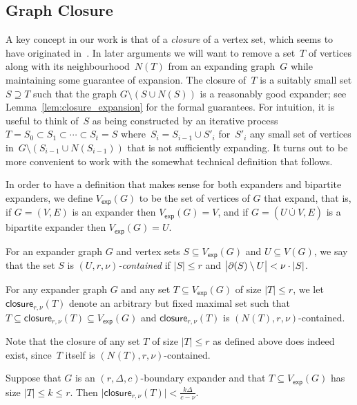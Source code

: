 \documentclass{article}
\newcommand{\boundary}[1]{\ensuremath{\partial #1}}
\newcommand{\Setsize}[1]{\bigl\lvert#1\bigr\rvert}
\newcommand{\setsize}[1]{\lvert#1\rvert}
\newcommand{\disjointunion}{\overset{.}{\cup}}
\newcommand{\reflem}[1]{Lemma~\ref{#1}}
\newcommand{\neigh}[2][]{N_{{#1}}(#2)}
\newcommand{\uniqueNeigh}[2][]{\boundary_{{#1}} ({#2})}
\newcommand{\GdegMax}{\Delta}
\newcommand{\gdegmax}{\GdegMax}
\newcommand{\contained}[3]{$(#1, #2, #3)$-contained}
\newcommand{\closure}[2][]{\mathsf{closure}_{{#1}}(#2)}
\newcommand{\expansionconst}{c}
\newcommand{\almostcontained}{\nu}
\newcommand{\setsizemax}{k}
\newcommand{\squeezesubsection}[1]{\subsection{#1}}
\numberwithin{equation}{section}
\begin{document}
\squeezesubsection{Graph Closure}

\newcommand{\Vexp}{V_{\mathsf{exp}}}

A key concept in our work is that of a \emph{closure} of a vertex set,
which seems to have originated
in~\cite{ABRW04Pseudorandom,AR03LowerBounds}. In later arguments we
will want to remove a set~$T$ of vertices along with its
neighbourhood~$N(T)$ from an expanding graph~$G$ while maintaining
some guarantee of expansion. The closure of~$T$ is a suitably small
set $S \supseteq T$ such that the graph $G\setminus (S \cup N(S))$ is
a reasonably good expander; see \reflem{lem:closure_expansion} for the
formal guarantees. For intuition, it is useful to think of~$S$ as being
constructed by an iterative
process~$T = S_0 \subset S_1 \subset \cdots \subset S_t = S$
where~$S_i = S_{i-1} \cup S'_i$ for~$S'_i$ any small set of vertices
in~$G\setminus (S_{i-1} \cup N(S_{i-1}))$ that is not sufficiently
expanding. It turns out to be more convenient to work with the
somewhat technical definition that follows.

In order to have a definition that makes sense for both expanders and
bipartite expanders, we define $\Vexp(G)$ to be the set of vertices of
$G$ that expand, that is, if $G=(V,E)$ is an expander then
$\Vexp(G) = V$, and if $G=(U\disjointunion V, E)$ is a bipartite
expander then $\Vexp(G) = U$.

\begin{definition}[Closure]\label{def:closure}
  For an expander graph $G$ and
  vertex sets $S \subseteq \Vexp(G) $ and $U \subseteq V(G)$,
  we say that
  the set $S$ is \emph{\contained{U}{r}{\almostcontained}} if
  $\setsize{S} \le r$ 
  and 
  $
  \Setsize{
    \uniqueNeigh{S} \setminus U
  }
  <
  \almostcontained \cdot \setsize{S}$. 

  For any expander graph $G$  and any set $T \subseteq \Vexp(G)$       of size $\setsize{T} \leq r$, we let
  $\closure[r, \almostcontained]{T}$
  denote an arbitrary but fixed maximal set
  such that
  $T \subseteq \closure[r, \almostcontained]{T} \subseteq \Vexp(G)$
  and  $\closure[r, \almostcontained]{T}$ is
  \contained{\neigh{T}}{r}{\almostcontained}.
\end{definition}

Note that the closure of any set $T$ of size 
$\setsize{T} \le r$ as defined above does indeed exist, since~$T$ itself is
\contained{\neigh{T}}{r}{\almostcontained}.

\begin{lemma}\label{lem:closure_size}
  Suppose that $G$ 
  is an $(r, \gdegmax, \expansionconst )$-boundary expander
  and that
  $T \subseteq \Vexp(G)$ has size $\setsize{T} \le \setsizemax \le r$. 
  Then
  $\setsize{ \closure[r, \almostcontained]{T} } < 
  \frac{\setsizemax \GdegMax}{\expansionconst -
    \almostcontained}$.
\end{lemma}
\end{document}

